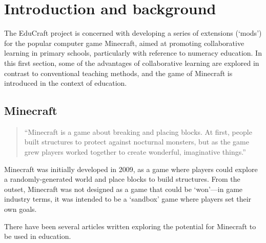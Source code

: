 \chapter{Introduction and background}
The EduCraft project is concerned with developing a series of extensions
(`mods') for the popular computer game Minecraft, aimed at promoting
collaborative learning in primary schools, particularly with reference
to numeracy education. In this first section, some of the advantages of
collaborative learning are explored in contrast to conventional teaching
methods, and the game of Minecraft is introduced in the context of education.

\section{Minecraft}
\begin{quote}
``Minecraft is a game about breaking and placing blocks. At first, people
built structures to protect against nocturnal monsters, but as the game grew
players worked together to create wonderful, imaginative things.''
\cite{website:minecraft}
\end{quote}

Minecraft was initially developed in 2009, as a game where players could
explore a randomly-generated world and place blocks to build structures. From
the outset, Minecraft was not designed as a game that could be `won'---in
game industry terms, it was intended to be a `sandbox' game where players set
their own goals.

There have been several articles written exploring the potential for Minecraft
to be used in education\cite{brand13}.
